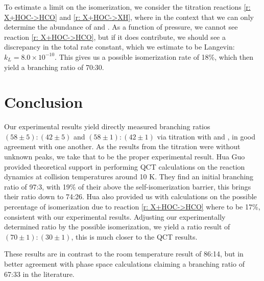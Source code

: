 To estimate a limit on the isomerization, we consider the titration reactions \ref{r: X+HOC->HCO} and \ref{r: X+HOC->XH}, where  in the context that we can only determine the abundance of \ce{[HCO]+} and . As a function of pressure, we cannot see reaction \ref{r: X+HOC->HCO}, but if it does contribute, we should see a discrepancy in the total rate constant, which we estimate to be Langevin: $k_L = 8.0 \times 10^{-10}$. This gives us a possible isomerization rate of 18\%, which then yield a branching ratio of 70:30.
%


\section{Conclusion}

Our experimental results yield directly measured branching ratios $(58\pm5):(42\pm5)$ and $(58\pm1):(42\pm1)$ via titration with  and , in good agreement with one another. As the results from the  titration were without unknown peaks, we take that to be the proper experimental result. Hua Guo provided theoretical support in performing QCT calculations on the  reaction dynamics at collision temperatures around 10 K. They find an initial branching ratio of 97:3, with 19\% of their  above the self-isomerization barrier, this brings their ratio down to 74:26. Hua also provided us with calculations on the possible percentage of isomerization due to reaction \ref{r: X+HOC->HCO} where  to be 17\%, consistent with our experimental results. Adjusting our experimentally determined ratio by the possible isomerization, we yield a ratio result of $(70\pm1):(30\pm1)$, this is much closer to the QCT results.

These results are in contrast to the room temperature result of 86:14\cite{Love1987}, but in better agreement with phase space calculations claiming a branching ratio of 67:33 in the literature.\cite{DeFrees1984}